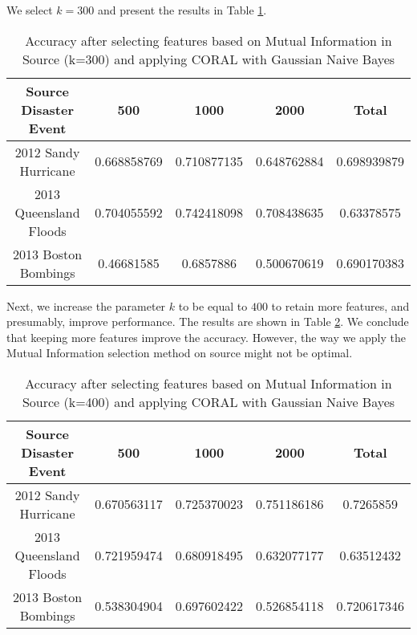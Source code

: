 We select $k=300$ and present the results in Table \ref{tablemisource300}. 

\begin{table}[ht]
    \begin{center}
    \caption{Accuracy after selecting features based on Mutual Information in Source (k=300) and applying CORAL with Gaussian Naive Bayes}
    \begin{tabular}[c]{|c|c|c|c|c|}
        \hline
        Source Disaster Event & 500 & 1000 & 2000 & Total \\
        \hline
        2012 Sandy Hurricane & 0.668858769 & 0.710877135 & 0.648762884 & 0.698939879 \\
        2013 Queensland Floods & 0.704055592 & 0.742418098 & 0.708438635 & 0.63378575 \\
        2013 Boston Bombings & 0.46681585 & 0.6857886 & 0.500670619 & 0.690170383 \\
        \hline
    \end{tabular}
    \label{tablemisource300}
   \end{center}
\end{table}

Next, we increase the parameter $k$ to be equal to $400$ to retain more features, and presumably, improve performance.
The results are shown in Table \ref{tablemisource400}. We conclude that keeping more features improve the accuracy. However, the way we apply the Mutual Information selection method on source might not be optimal.

\begin{table}[ht]
    \begin{center}
    \caption{Accuracy after selecting features based on Mutual Information in Source (k=400) and applying CORAL with  Gaussian Naive Bayes}
    \begin{tabular}[c]{|c|c|c|c|c|}
        \hline
        Source Disaster Event & 500 & 1000 & 2000 & Total \\
        \hline
        2012 Sandy Hurricane & 0.670563117 & 0.725370023 & 0.751186186 & 0.7265859 \\
        2013 Queensland Floods & 0.721959474 & 0.680918495 & 0.632077177 & 0.63512432 \\
        2013 Boston Bombings & 0.538304904 & 0.697602422 & 0.526854118 & 0.720617346 \\
        \hline
    \end{tabular}
    \label{tablemisource400}
   \end{center}
\end{table}

